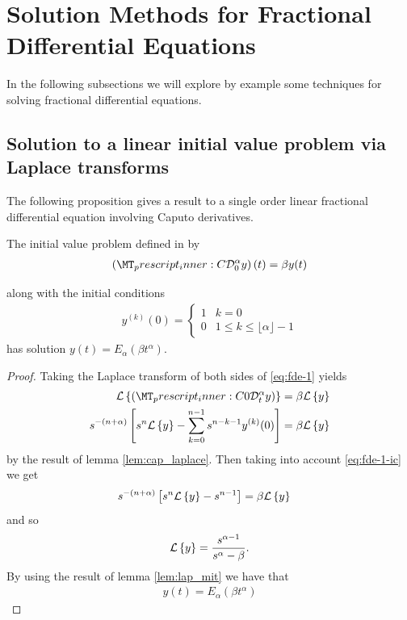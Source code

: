 \section{Solution Methods for Fractional Differential Equations}

In the following subsections we will explore by example some techniques for solving fractional differential equations.

\subsection{Solution to a linear initial value problem via Laplace transforms}
The following proposition gives a result to a single order linear fractional differential equation involving Caputo derivatives.
\begin{mdframed}[innertopmargin=10pt]
\begin{proposition}

	The initial value problem defined in by
	\begin{align}
        \label{eq:fde-1}
        \left( \prescript{C}{}{\mathcal{D}_0^\alpha}y \right)(t) = \beta y(t)
    \end{align}
    
    along with the initial conditions
    \begin{align}
        \label{eq:fde-1-ic}
        y^{(k)}(0) =
        \begin{cases}
        1 & k = 0 \\
        0 & 1 \leq k \leq \lfloor\alpha \rfloor - 1
        \end{cases}
    \end{align}
	has solution $ y(t) = E_\alpha \left( \beta t^\alpha \right) $.
\end{proposition}
\end{mdframed}
\begin{proof}
	Taking the Laplace transform of both sides of \eqref{eq:fde-1} yields
	\begin{align*}
		\laplace{\capder{0}{t}{\alpha}{y}} &= \beta \laplace{y} \\
		s^{-(n+\alpha)} \left[s^n \laplace{y} - \sum_{k=0}^{n-1} s^{n-k-1} y^{(k)}(0) \right] &= \beta \laplace{y}
	\end{align*}
	by the result of lemma \ref{lem:cap_laplace}. 
	Then taking into account \eqref{eq:fde-1-ic} we get
	\begin{align*}
		s^{-(n+\alpha)} \left[s^n \mathcal{L} \left\{ y \right\} - s^{n-1}\right] &= \beta \mathcal{L} \left\{ y \right\}
	\end{align*}
	and so 
	\begin{align*}
		\mathcal{L} \left\{ y \right\} = \frac{s^{\alpha-1}}{s^\alpha - \beta}.
	\end{align*}
	By using the result of lemma \ref{lem:lap_mit} we have that 
	\begin{align*}
		y(t) = E_\alpha(\beta t^\alpha)
	\end{align*}
\end{proof}
